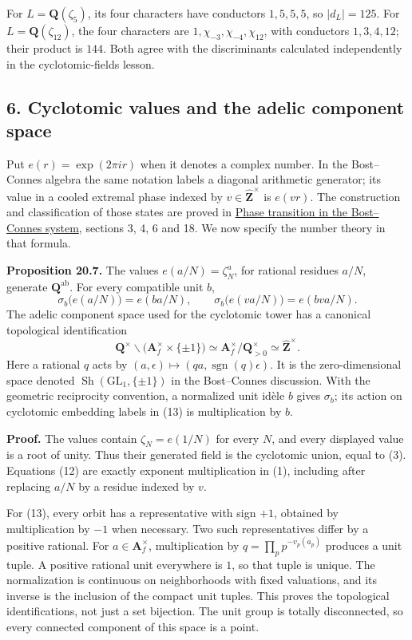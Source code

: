 \documentclass[11pt,a4paper]{article}
\begin{document}
For \(L=\mathbf Q(\zeta_5)\), its four characters have conductors
\(1,5,5,5\), so \(|d_L|=125\). For \(L=\mathbf Q(\zeta_{12})\), the four
characters are \(1,\chi_{-3},\chi_{-4},\chi_{12}\), with conductors
\(1,3,4,12\); their product is \(144\). Both agree with the
discriminants calculated independently in the cyclotomic-fields lesson.

\subsection{6. Cyclotomic values and the adelic component
space}\label{cyclotomic-values-and-the-adelic-component-space}

Put \(e(r)=\exp(2\pi ir)\) when it denotes a complex number. In the
Bost--Connes algebra the same notation labels a diagonal arithmetic
generator; its value in a cooled extremal phase indexed by
\(v\in\widehat{\mathbf Z}^{\times}\) is \(e(vr)\). The construction and
classification of those states are proved in
\href{https://kokunoyumeto.github.io/open-math-courses/courses/NT-CFT/proof-dependencies.html\#QSM-L04}{Phase
transition in the Bost--Connes system}, sections 3, 4, 6 and 18. We now
specify the number theory in that formula.

\textbf{Proposition 20.7.} The values \(e(a/N)=\zeta_N^a\), for rational
residues \(a/N\), generate \(\mathbf Q^{\mathrm{ab}}\). For every
compatible unit \(b\), \[
\sigma_b\bigl(e(a/N)\bigr)=e(ba/N),\qquad
\sigma_b\bigl(e(va/N)\bigr)=e(bva/N).
\tag{12}
\] The adelic component space used for the cyclotomic tower has a
canonical topological identification \[
\mathbf Q^\times\backslash
\bigl(\mathbf A_f^\times\times\{\pm1\}\bigr)
\simeq \mathbf A_f^\times/\mathbf Q_{>0}^\times
\simeq\widehat{\mathbf Z}^{\times}.
\tag{13}
\] Here a rational \(q\) acts by
\((a,\epsilon)\mapsto(qa,\operatorname{sgn}(q)\epsilon)\). It is the
zero-dimensional space denoted
\(\operatorname{Sh}(\mathrm{GL}_1,\{\pm1\})\) in the Bost--Connes
discussion. With the geometric reciprocity convention, a normalized unit
idèle \(b\) gives \(\sigma_b\); its action on cyclotomic embedding
labels in (13) is multiplication by \(b\).

\textbf{Proof.} The values contain \(\zeta_N=e(1/N)\) for every \(N\),
and every displayed value is a root of unity. Thus their generated field
is the cyclotomic union, equal to (3). Equations (12) are exactly
exponent multiplication in (1), including after replacing \(a/N\) by a
residue indexed by \(v\).

For (13), every orbit has a representative with sign \(+1\), obtained by
multiplication by \(-1\) when necessary. Two such representatives differ
by a positive rational. For \(a\in\mathbf A_f^\times\), multiplication
by \(q=\prod_p p^{-v_p(a_p)}\) produces a unit tuple. A positive
rational unit everywhere is \(1\), so that tuple is unique. The
normalization is continuous on neighborhoods with fixed valuations, and
its inverse is the inclusion of the compact unit tuples. This proves the
topological identifications, not just a set bijection. The unit group is
totally disconnected, so every connected component of this space is a
point.
\end{document}
